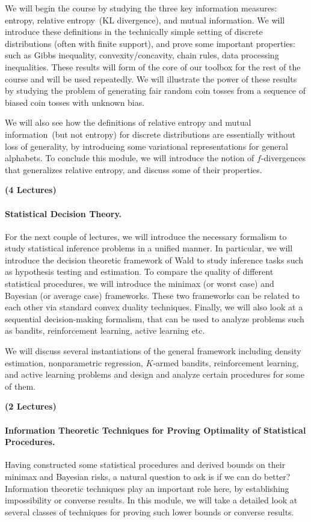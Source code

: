 \documentclass[12pt]{article}
\begin{document}
We will begin the course by studying the three key information measures: entropy, relative entropy~(KL divergence), and mutual information. We will introduce these definitions in the technically simple setting of discrete distributions (often with finite support), and prove some important properties: such as Gibbs inequality, convexity/concavity, chain rules, data processing inequalities. These results will form of the core of our toolbox for the rest of the course and will be used repeatedly. We will illustrate the power of these results by studying the problem of generating fair random coin tosses from a sequence of biased coin tosses with unknown bias.  

We will also see how the definitions of relative entropy and mutual information~(but not entropy) for discrete distributions are essentially without loss of generality, by introducing some variational representations for general alphabets. To conclude this module, we will introduce the notion of $f$-divergences that generalizes relative entropy, and discuss some of their properties.  

\hfill \textbf{(4 Lectures)}


\paragraph{Statistical Decision Theory.} For the next couple of lectures, we will introduce the necessary formalism to study statistical inference problems in a unified manner. In particular, we will introduce the decision theoretic framework of Wald to study inference tasks such as hypothesis testing and estimation. To compare the quality of different statistical procedures, we will introduce the minimax (or worst case) and Bayesian (or average case) frameworks. These two frameworks can be related to each other via standard convex duality techniques. Finally, we will also look at a sequential decision-making formalism, that can be used to analyze problems such as bandits, reinforcement learning, active learning etc. 

We will discuss several instantiations of the general framework including density estimation, nonparametric regression, $K$-armed bandits, reinforcement learning, and active learning problems and design and analyze certain procedures for some of them. 

\hfill \textbf{(2 Lectures)}

\paragraph{Information Theoretic Techniques for Proving Optimality of Statistical Procedures.}
Having constructed some statistical procedures and derived bounds on their minimax and Bayesian risks, a natural question to ask is if we can do better? Information theoretic techniques play an important role here, by establishing impossibility or converse results. In this module, we will take a detailed look at several classes of techniques for proving such lower bounds or converse results. 
\end{document}
